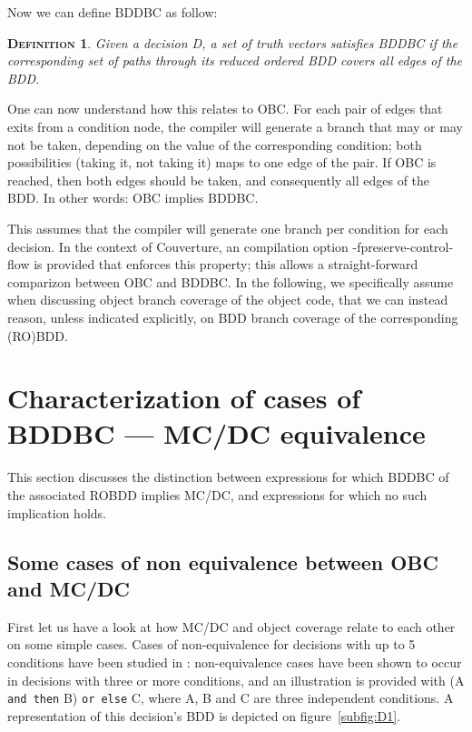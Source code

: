 \documentclass[a4paper,12pt,twoside]{article}
\newcommand{\couv}{{\sc Couverture}}
\newcommand{\andthen}{\texttt{and then}}
\newcommand{\orelse}{\texttt{or else}}
\newtheorem{definition}{\textsc{Definition}}
\begin{document}
Now we can define BDDBC as follow:

\begin{definition}
  \label{def:bddbc}
  Given a decision D, a set of truth vectors satisfies BDDBC
  if the corresponding set of paths through its reduced ordered BDD
  covers all edges of the BDD.
\end{definition}

One can now understand how this relates to OBC. For each pair of edges that
exits from a condition node, the compiler will generate a branch that
may or may not be taken, depending on the value of the corresponding
condition; both possibilities (taking it, not taking it) maps to one
edge of the pair. If OBC is reached, then both edges should be taken,
and consequently all edges of the BDD. In other words: OBC implies
BDDBC.

This assumes that the compiler will generate one branch per condition
for each decision. In the context of \couv{}, an compilation option
-fpreserve-control-flow is provided that enforces this property; this
allows a straight-forward comparizon between OBC and BDDBC. In the
following, we specifically assume when discussing object branch
coverage of the object code, that we can instead reason, unless
indicated explicitly, on BDD branch coverage of the corresponding
(RO)BDD.


\section{Characterization of cases of BDDBC --- MC/DC equivalence}

This section discusses the distinction between expressions for which
BDDBC of the associated ROBDD implies MC/DC, and expressions for which
no such implication holds.

\subsection{Some cases of non equivalence between OBC and MC/DC}

First let us have a look at how MC/DC and object coverage relate to each
other on some simple cases. Cases of non-equivalence for decisions with up to
5 conditions have been studied in \cite{ar0720}: non-equivalence cases
have been shown to occur in decisions with three or more conditions,
and an illustration is provided with (A \andthen{} B) \orelse{} C,
where A, B and C are three independent conditions.
%
A representation of this decision's BDD is depicted on
figure~\ref{subfig:D1}.
\end{document}
